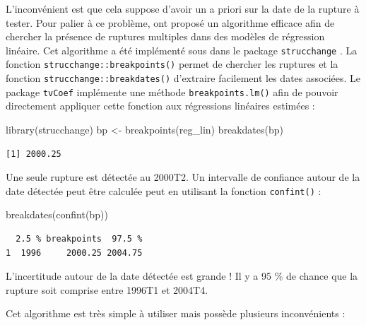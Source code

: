 \documentclass[
  a4paper,
  DIV=11,
  numbers=noendperiod,
  french]{scrartcl}
\newenvironment{Shaded}{\begin{snugshade}}{\end{snugshade}}
\newcommand{\FunctionTok}[1]{\textcolor[rgb]{0.28,0.35,0.67}{#1}}
\newcommand{\NormalTok}[1]{\textcolor[rgb]{0.00,0.23,0.31}{#1}}
\newcommand{\OtherTok}[1]{\textcolor[rgb]{0.00,0.23,0.31}{#1}}
\newcommand\1{{\mathds 1}}
\theoremstyle{remark}
\begin{document}
L'inconvénient est que cela suppose d'avoir un a priori sur la date de
la rupture à tester. Pour palier à ce problème,
\textcite{bai2003computation} ont proposé un algorithme efficace afin de
chercher la présence de ruptures multiples dans des modèles de
régression linéaire. Cet algorithme a été implémenté sous
 dans le package \texttt{strucchange}
\autocite{strucchangeBP}. La fonction
\texttt{strucchange::breakpoints()} permet de chercher les ruptures et
la fonction \texttt{strucchange::breakdates()} d'extraire facilement les
dates associées. Le package \texttt{tvCoef} implémente une méthode
\texttt{breakpoints.lm()} afin de pouvoir directement appliquer cette
fonction aux régressions linéaires estimées :

\begin{Shaded}
\begin{Highlighting}[]
\FunctionTok{library}\NormalTok{(strucchange)}
\NormalTok{bp }\OtherTok{\textless{}{-}} \FunctionTok{breakpoints}\NormalTok{(reg\_lin)}
\FunctionTok{breakdates}\NormalTok{(bp)}
\end{Highlighting}
\end{Shaded}

\begin{verbatim}
[1] 2000.25
\end{verbatim}

Une seule rupture est détectée au 2000T2. Un intervalle de confiance
autour de la date détectée peut être calculée peut en utilisant la
fonction \texttt{confint()} :

\begin{Shaded}
\begin{Highlighting}[]
\FunctionTok{breakdates}\NormalTok{(}\FunctionTok{confint}\NormalTok{(bp))}
\end{Highlighting}
\end{Shaded}

\begin{verbatim}
  2.5 % breakpoints  97.5 %
1  1996     2000.25 2004.75
\end{verbatim}

L'incertitude autour de la date détectée est grande ! Il y a 95 \% de
chance que la rupture soit comprise entre 1996T1 et 2004T4.

Cet algorithme est très simple à utiliser mais possède plusieurs
inconvénients :
\end{document}
